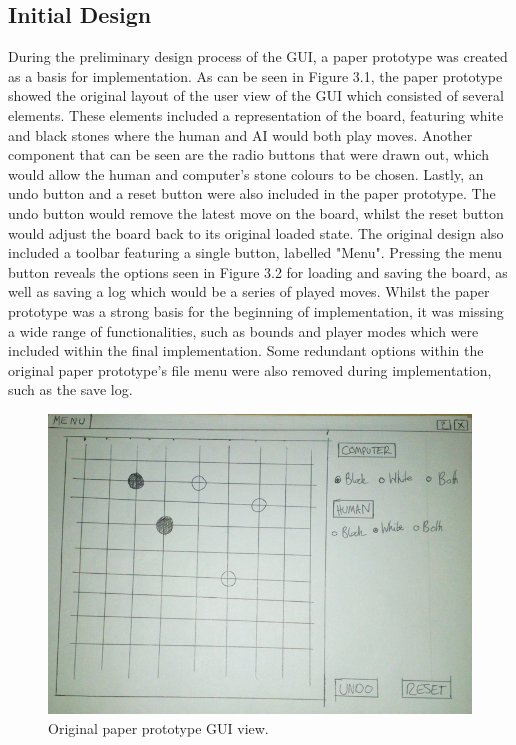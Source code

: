 \documentclass{l3proj}
\begin{document}
\subsection{Initial Design}

During the preliminary design process of the GUI, a paper prototype was created as a basis for implementation. As can be seen in Figure 3.1, the paper prototype showed the original layout of the user view of the GUI which consisted of several elements. These elements included a representation of the board, featuring white and black stones where the human and AI would both play moves. Another component that can be seen are the radio buttons that were drawn out, which would allow the human and computer's stone colours to be chosen. Lastly, an undo button and a reset button were also included in the paper prototype. The undo button would remove the latest move on the board, whilst the reset button would adjust the board back to its original loaded state. The original design also included a toolbar featuring a single button, labelled "Menu".  Pressing the menu button reveals the options seen in Figure 3.2 for loading and saving the board, as well as saving a log which would be a series of played moves. Whilst the paper prototype was a strong basis for the beginning of implementation, it was missing a wide range of functionalities, such as bounds and player modes which were included within the final implementation. Some redundant options within the original paper prototype's file menu were also removed during implementation, such as the save log.

\begin{figure}[H]
\centering
\includegraphics[scale=0.4]{Images/GUI-1-PP.png}
\caption{Original paper prototype GUI view.}
\end{figure}
\end{document}
